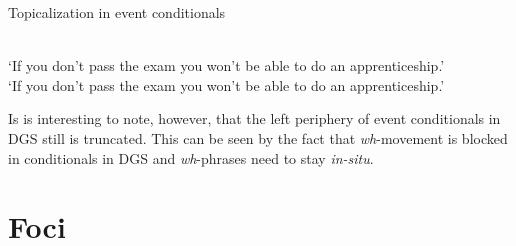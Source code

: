 \begin{digression}{Topicalization in event conditionals}{}
\begin{exe}
\ex\begin{xlist}  \label{bavarianextractiondgs}
\ex {}  \\
`If you don't pass the exam you won't be able to do an apprenticeship.' \label{bavarianextractiondgsa}
\ex {}   \\
`If you don't pass the exam you won't be able to do an apprenticeship.' \label{bavarianextractiondgsb}
\end{xlist}
\end{exe}

\noindent Is is interesting to note, however, that the left periphery of event conditionals in DGS still is truncated. This can be seen by the fact that \textit{wh}-movement is blocked in conditionals in DGS and \textit{wh}-phrases need to stay \textit{in-situ}.




%

\end{digression}


\largerpage
\section{Foci}\label{generalfocussection}
